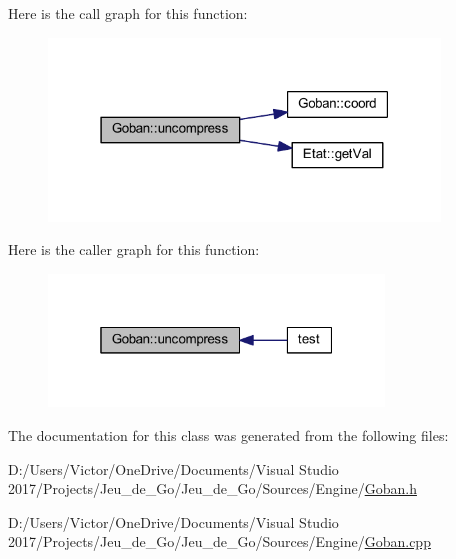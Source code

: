 Here is the call graph for this function\+:
\nopagebreak
\begin{figure}[H]
\begin{center}
\leavevmode
\includegraphics[width=295pt]{class_goban_aa23b735d8d72bb0fe189005e968e9329_cgraph}
\end{center}
\end{figure}
Here is the caller graph for this function\+:
\nopagebreak
\begin{figure}[H]
\begin{center}
\leavevmode
\includegraphics[width=253pt]{class_goban_aa23b735d8d72bb0fe189005e968e9329_icgraph}
\end{center}
\end{figure}


The documentation for this class was generated from the following files\+:\begin{DoxyCompactItemize}
\item 
D\+:/\+Users/\+Victor/\+One\+Drive/\+Documents/\+Visual Studio 2017/\+Projects/\+Jeu\+\_\+de\+\_\+\+Go/\+Jeu\+\_\+de\+\_\+\+Go/\+Sources/\+Engine/\hyperlink{_goban_8h}{Goban.\+h}\item 
D\+:/\+Users/\+Victor/\+One\+Drive/\+Documents/\+Visual Studio 2017/\+Projects/\+Jeu\+\_\+de\+\_\+\+Go/\+Jeu\+\_\+de\+\_\+\+Go/\+Sources/\+Engine/\hyperlink{_goban_8cpp}{Goban.\+cpp}\end{DoxyCompactItemize}
